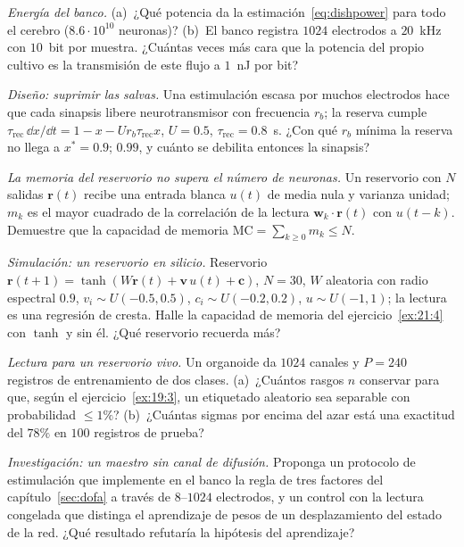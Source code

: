 \begin{exercise}[\lvlA]
\label{ex:21:2}
\emph{Energía del banco.} (a)~¿Qué potencia da la estimación~\eqref{eq:dishpower} para todo el cerebro ($8.6\cdot10^{10}$ neuronas)? (b)~El banco registra $1024$ electrodos a $20$~kHz con $10$~bit por muestra. ¿Cuántas veces más cara que la potencia del propio cultivo es la transmisión de este flujo a $1$~nJ por bit?
\end{exercise}

\begin{exercise}[\lvlB]
\label{ex:21:3}
\emph{Diseño: suprimir las salvas.} Una estimulación escasa por muchos electrodos hace que cada sinapsis libere neurotransmisor con frecuencia $r_b$; la reserva cumple $\tau_{\text{rec}}\,\dd x/\dd t=1-x-Ur_b\tau_{\text{rec}}x$, $U=0.5$, $\tau_{\text{rec}}=0.8$~s. ¿Con qué $r_b$ mínima la reserva no llega a $x^*=0.9$; $0.99$, y cuánto se debilita entonces la sinapsis?
\end{exercise}

\begin{exercise}[\lvlB]
\label{ex:21:4}
\emph{La memoria del reservorio no supera el número de neuronas.} Un reservorio con $N$ salidas $\mathbf r(t)$ recibe una entrada blanca $u(t)$ de media nula y varianza unidad; $m_k$ es el mayor cuadrado de la correlación de la lectura $\mathbf w_k\cdot\mathbf r(t)$ con $u(t-k)$. Demuestre que la capacidad de memoria $\mathrm{MC}=\sum_{k\ge0}m_k\le N$.
\end{exercise}

\begin{exercise}[\lvlB]
\label{ex:21:5}
\emph{Simulación: un reservorio en silicio.} Reservorio $\mathbf r(t+1)=\tanh(W\mathbf r(t)+\mathbf v\,u(t)+\mathbf c)$, $N=30$, $W$ aleatoria con radio espectral $0.9$, $v_i\sim U(-0.5,0.5)$, $c_i\sim U(-0.2,0.2)$, $u\sim U(-1,1)$; la lectura es una regresión de cresta. Halle la capacidad de memoria del ejercicio~\ref{ex:21:4} con $\tanh$ y sin él. ¿Qué reservorio recuerda más?
\end{exercise}

\begin{exercise}[\lvlB]
\label{ex:21:6}
\emph{Lectura para un reservorio vivo.} Un organoide da $1024$ canales y $P=240$ registros de entrenamiento de dos clases. (a)~¿Cuántos rasgos $n$ conservar para que, según el ejercicio~\ref{ex:19:3}, un etiquetado aleatorio sea separable con probabilidad $\le1\%$? (b)~¿Cuántas sigmas por encima del azar está una exactitud del $78\%$ en $100$ registros de prueba?
\end{exercise}

\begin{exercise}[\lvlC]
\label{ex:21:7}
\emph{Investigación: un maestro sin canal de difusión.} Proponga un protocolo de estimulación que implemente en el banco la regla de tres factores del capítulo~\ref{sec:dofa} a través de $8$--$1024$ electrodos, y un control con la lectura congelada que distinga el aprendizaje de pesos de un desplazamiento del estado de la red. ¿Qué resultado refutaría la hipótesis del aprendizaje?
\end{exercise}
